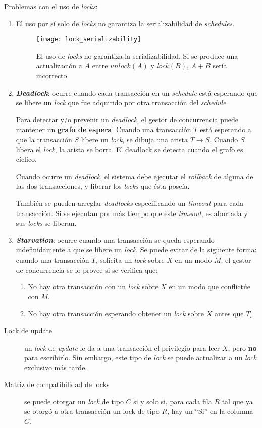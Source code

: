 \documentclass[a4paper, twoside]{article}
\begin{document}
Problemas con el uso de \emph{locks}:
\begin{enumerate}
	\item El uso por sí solo de \emph{locks} no garantiza la serializabilidad de \emph{schedules}.
	\begin{figure}[H]
		\centering
		\texttt{[image: lock\_serializability]}
		\caption{El uso de \emph{locks} no garantiza la serializabilidad. Si se produce una actualización a $A$ entre $unlock(A)$ y $lock(B)$, \textbf{$A+B$} sería incorrecto}
	\end{figure}

	\item \textbf{\emph{Deadlock}}: ocurre cuando cada transacción en un \emph{schedule} está esperando que se libere un \emph{lock} que fue adquirido por otra transacción del \emph{schedule}.

	Para detectar y/o prevenir un \emph{deadlock}, el gestor de concurrencia puede mantener un \textbf{grafo de espera}. Cuando una transacción $T$ está esperando a que la transacción $S$ libere un \emph{lock}, se dibuja una arista $T\to S$. Cuando $S$ libera el \emph{lock}, la arista se borra. El deadlock se detecta cuando el grafo es cíclico.

	Cuando ocurre un \emph{deadlock}, el sistema debe ejecutar el \emph{rollback} de alguna de las dos transacciones, y liberar los \emph{locks} que ésta poseía.

	También se pueden arreglar \emph{deadlocks} especificando un \emph{timeout} para cada transacción. Si se ejecutan por más tiempo que este \emph{timeout}, es abortada y sus \emph{locks} se liberan.

	\item \textbf{\emph{Starvation}}: ocurre cuando una transacción se queda esperando indefinidamente a que se libere un \emph{lock}. Se puede evitar de la siguiente forma: cuando una transacción $T_{i}$ solicita un \emph{lock} sobre $X$ en un modo $M$, el gestor de concurrencia se lo provee si se verifica que:
	\begin{enumerate}
		\item No hay otra transacción con un \emph{lock }sobre $X$ en un modo que conflictúe con $M$.
		\item No hay otra transacción esperando obtener un \emph{lock }sobre $X$ antes que $T_{i}$
	\end{enumerate}
\end{enumerate}

\begin{description}
	\item[Lock de update] un \emph{lock} de \emph{update} le da a una transacción el privilegio para leer $X$, pero \textbf{no} para escribirlo. Sin embargo, este tipo de \emph{lock} se puede actualizar a un \emph{lock} exclusivo más tarde.
	\item[Matriz de compatibilidad de locks] se puede otorgar un \emph{lock} de tipo $C$ si y solo si, para cada fila $R$ tal que ya se otorgó a otra transacción un lock de tipo $R$, hay un ``Si'' en la columna $C$.
\end{description}
\end{document}
